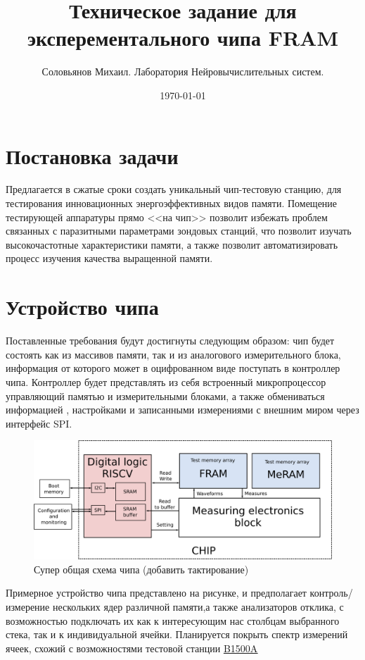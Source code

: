 \documentclass[a4paper,12pt]{article} %
\author{Соловьянов Михаил. Лаборатория Нейровычислительных систем.}
\title{Техническое задание для эксперементального чипа FRAM}
\date{\today}
\begin{document}
\thispagestyle{fancy}
\maketitle



\section{ Постановка задачи}


Предлагается в сжатые сроки создать уникальный чип-тестовую станцию, для тестирования инновационных энергоэффективных видов памяти. Помещение тестирующей аппаратуры прямо <<на чип>> позволит избежать проблем связанных с паразитными  параметрами зондовых станций, что позволит изучать высокочастотные характеристики памяти, а также позволит автоматизировать процесс изучения качества выращенной памяти. 

\section{Устройство чипа}

Поставленные требования будут достигнуты следующим образом: чип будет состоять как из массивов памяти, так и из аналогового измерительного блока, информация от которого может в оцифрованном виде поступать в контроллер чипа. Контроллер будет представлять из себя встроенный микропроцессор управляющий памятью и измерительными блоками, а также обмениваться информацией , настройками и записанными измерениями с внешним миром через интерфейс SPI. 
\begin{figure}[h]
\centering
\includegraphics[width=\textwidth]{top.png}
\caption{Супер общая схема чипа (добавить тактирование)}
\end{figure}

Примерное устройство чипа представлено на рисунке, и предполагает контроль/измерение нескольких ядер различной памяти,а также анализаторов отклика, с возможностью подключать их как к интересующим нас столбцам выбранного стека, так и к индивидуальной ячейки. Планируется покрыть спектр измерений ячеек, схожий с возможностями тестовой станции \underline{ \href{https://www.keysight.com/ru/ru/assets/7018-01289/data-sheets/5989-2785.pdf}{B1500A} }
\end{document}
